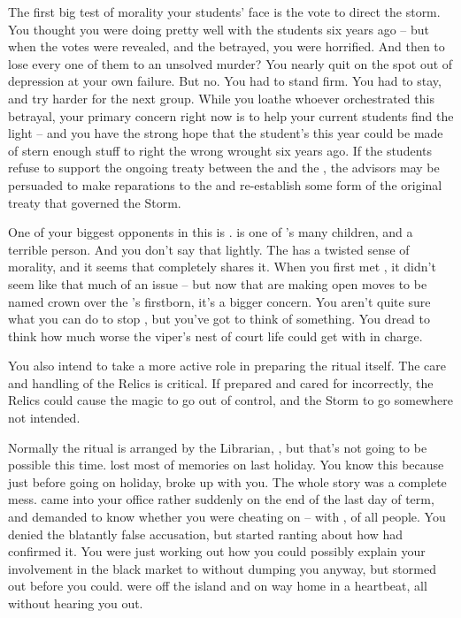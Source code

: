 \documentclass[char]{GL2020}
\begin{document}
The first big test of morality your students’ face is the vote to direct the storm. You thought you were doing pretty well with the students six years ago -- but when the votes were revealed, and the \pShip{} betrayed, you were horrified. And then to lose every one of them to an unsolved murder? You nearly quit on the spot out of depression at your own failure. But no. You had to stand firm. You had to stay, and try harder for the next group. While you loathe whoever orchestrated this betrayal, your primary concern right now is to help your current students find the light -- and you have the strong hope that the student’s this year could be made of stern enough stuff to right the wrong wrought six years ago. If the students refuse to support the ongoing treaty between the \pFarm{} and the \pTech{}, the advisors may be persuaded to make reparations to the \pShip{} and re-establish some form of the original treaty that governed the Storm.

One of your biggest opponents in this is \cPrince{\full}. \cPrince{} is one of \cQueen{\Majesty} \cQueen{}’s many children, and a terrible person. And you don’t say that lightly. The \cQueen{\Majesty} has a twisted sense of morality, and it seems that \cPrince{} completely shares it. When you first met \cPrince{\them}, it didn’t seem like that much of an issue -- but now that \cPrince{\they} are making open moves to be named crown \cPrince{\Heir} over the \cQueen{\Majesty}’s firstborn, it’s a bigger concern. You aren’t quite sure what you can do to stop \cPrince{}, but you’ve got to think of something. You dread to think how much worse the viper’s nest of \pFarm{} court life could get with \cPrince{} in charge.

You also intend to take a more active role in preparing the ritual itself. The care and handling of the Relics is critical. If prepared and cared for incorrectly, the Relics could cause the magic to go out of control, and the Storm to go somewhere not intended.

Normally the ritual is arranged by the Librarian, \cLibrarian{}, but that’s not going to be possible this time. \cLibrarian{} lost most of \cLibrarian{\their} memories on \cLibrarian{\their} last holiday. You know this because just before going on holiday, \cLibrarian{} broke up with you. The whole story was a complete mess. \cLibrarian{\They} came into your office rather suddenly on the end of the last day of term, and demanded to know whether you were cheating on \cLibrarian{\them} -- with \cChupSecond{}, of all people. You denied the blatantly false accusation, but \cLibrarian{} started ranting about how \cChupAvenger{} had confirmed it. You were just working out how you could possibly explain your involvement in the black market to \cLibrarian{} without \cLibrarian{\them} dumping you anyway, but \cLibrarian{\they} stormed out before you could. \cLibrarian{\They} were off the island and on \cLibrarian{\their} way home in a heartbeat, all without hearing you out.
\end{document}

